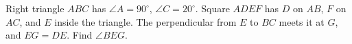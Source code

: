 Right triangle $ABC$ has $\angle A=90^\circ$, $\angle C=20^\circ$. Square $ADEF$ has $D$ on $AB$, $F$ on $AC$, and $E$ inside the triangle. The perpendicular from $E$ to $BC$ meets it at $G$, and $EG=DE$. Find $\angle BEG$.
